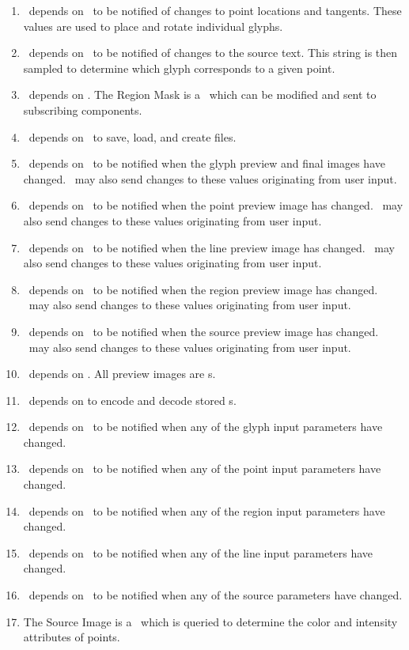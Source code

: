 {\begin{enumerate}
    \item \glymod\ depends on \ptmod\ to be notified of changes to point locations and tangents.  These values are used to place and rotate individual glyphs.
    \item \glymod\ depends on \srcmod\ to be notified of changes to the source text.  This string is then sampled to determine which glyph corresponds to a given point.
    \item \regmod\ depends on \bmmod.  The Region Mask is a \bmtype\ which can be modified and sent to subscribing components.
    \item \uimod\ depends on \docmod\ to save, load, and create files.
    \item \uimod\ depends on \glymod\ to be notified when the glyph preview and final images have changed.
          \uimod\ may also send changes to these values originating from user input.
    \item \uimod\ depends on \ptmod\ to be notified when the point preview image has changed.
          \uimod\ may also send changes to these values originating from user input.
    \item \uimod\ depends on \linemod\ to be notified when the line preview image has changed.
          \uimod\ may also send changes to these values originating from user input.
    \item \uimod\ depends on \regmod\ to be notified when the region preview image has changed.
          \uimod\ may also send changes to these values originating from user input.
    \item \uimod\ depends on \srcmod\ to be notified when the source preview image has changed.
          \uimod\ may also send changes to these values originating from user input.
    \item \uimod\ depends on \bmmod.  All preview images are \bmtype s.
    \item \docmod\ depends on \bmmod to encode and decode stored \bmtype s.
    \item \docmod\ depends on \glymod\ to be notified when any of the glyph input parameters have changed.
    \item \docmod\ depends on \ptmod\ to be notified when any of the point input parameters have changed.
    \item \docmod\ depends on \regmod\ to be notified when any of the region input parameters have changed.
    \item \docmod\ depends on \linemod\ to be notified when any of the line input parameters have changed.
    \item \docmod\ depends on \srcmod\ to be notified when any of the source parameters have changed.
    \item The Source Image is a \bmtype\ which is queried to determine the color and intensity attributes of points.
  \end{enumerate}

}
